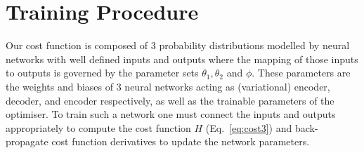\section{Training Procedure}\label{sec:training_procedure}
%
%
Our cost function is composed of 3 probability distributions 
modelled by neural networks with well defined inputs and outputs 
where the mapping of those inputs to outputs is governed by the parameter sets
$\theta_{1},\theta_{2}$ and $\phi$. These parameters are the 
weights and biases of 3 neural networks acting as (variational) 
encoder, decoder, and encoder respectively, as well as the trainable 
parameters of the optimiser. To train such a network one must 
connect the inputs and outputs appropriately to compute the cost 
function $H$ (Eq.~\ref{eq:cost3}) and back-propagate cost 
function derivatives to update the network parameters. 

